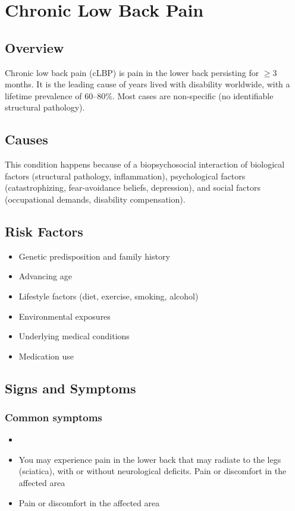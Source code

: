 \chapter{Chronic Low Back Pain}
\label{sec:Chronic Low Back Pain}

\section{Overview}
Chronic low back pain (cLBP) is pain in the lower back persisting for $\ge$3 months. It is the leading cause of years lived with disability worldwide, with a lifetime prevalence of 60--80\%. Most cases are non-specific (no identifiable structural pathology).
\section{Causes}
This condition happens because of a biopsychosocial interaction of biological factors (structural pathology, inflammation), psychological factors (catastrophizing, fear-avoidance beliefs, depression), and social factors (occupational demands, disability compensation).     
\section{Risk Factors}

\begin{itemize}[noitemsep]
  \item Genetic predisposition and family history
  \item Advancing age
  \item Lifestyle factors (diet, exercise, smoking, alcohol)
  \item Environmental exposures
  \item Underlying medical conditions
  \item Medication use
\end{itemize}
\section{Signs and Symptoms}

\subsection{Common symptoms}
\begin{itemize}[noitemsep]
  \item \item You may experience pain in the lower back that may radiate to the legs (sciatica), with or without neurological deficits. Pain or discomfort in the affected area    \item Pain or discomfort in the affected area
  \end{itemize}

